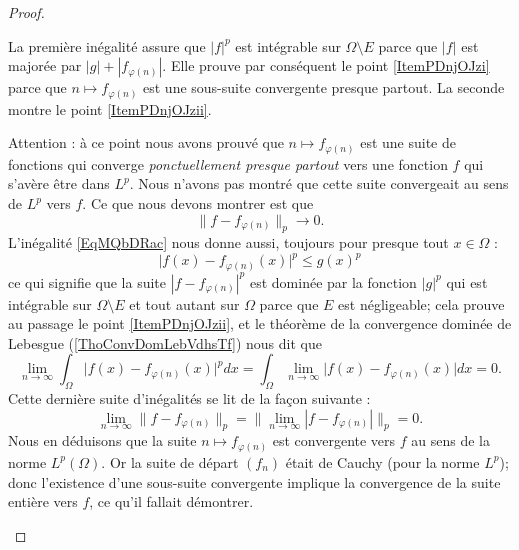 \begin{proof}
\begin{subproof}
        La première inégalité assure que \( | f |^p\) est intégrable sur \( \Omega\setminus E\) parce que \( | f |\) est majorée par \( | g |+| f_{\varphi(n)} |\). Elle prouve par conséquent le point \ref{ItemPDnjOJzi} parce que \(n\mapsto f_{\varphi(n)}\) est une sous-suite convergente presque partout. La seconde montre le point \ref{ItemPDnjOJzii}. 

        Attention : à ce point nous avons prouvé que \( n\mapsto f_{\varphi(n)}\) est une suite de fonctions qui converge \emph{ponctuellement presque partout} vers une fonction \( f\) qui s'avère être dans \( L^p\). Nous n'avons pas montré que cette suite convergeait au sens de \( L^p\) vers \( f\). Ce que nous devons montrer est que
        \begin{equation}    \label{EqJLfnEvj}
            \| f-f_{\varphi(n)} \|_p\to 0.
        \end{equation}
        L'inégalité \eqref{EqMQbDRac} nous donne aussi, toujours pour presque tout \( x\in \Omega\) :
        \begin{equation}
            \big| f(x)-f_{\varphi(n)}(x) \big|^p\leq g(x)^p
        \end{equation}
        ce qui signifie que la suite \(    | f-f_{\varphi(n)} |^p    \) est dominée par la fonction \( | g |^p\) qui est intégrable sur \( \Omega\setminus E\) et tout autant sur \( \Omega\) parce que \( E\) est négligeable; cela prouve au passage le point \ref{ItemPDnjOJzii}, et le théorème de la convergence dominée de Lebesgue (\ref{ThoConvDomLebVdhsTf}) nous dit que
        \begin{equation}
            \lim_{n\to \infty} \int_{\Omega} \big| f(x)-f_{\varphi(n)}(x) \big|^pdx=\int_{\Omega}\lim_{n\to \infty} \big| f(x)-f_{\varphi(n)}(x) \big|dx=0.
        \end{equation}
        Cette dernière suite d'inégalités se lit de la façon suivante :
        \begin{equation}
            \lim_{n\to \infty} \| f-f_{\varphi(n)} \|_p=\big\| \lim_{n\to \infty} | f-f_{\varphi(n)} | \big\|_p=0.
        \end{equation}
        Nous en déduisons que la suite \( n\mapsto f_{\varphi(n)}\) est convergente vers \( f\) au sens de la norme \( L^p(\Omega)\). Or la suite de départ \( (f_n)\) était de Cauchy (pour la norme \( L^p\)); donc l'existence d'une sous-suite convergente implique la convergence de la suite entière vers \( f\), ce qu'il fallait démontrer.
    \end{subproof}
\end{proof}


